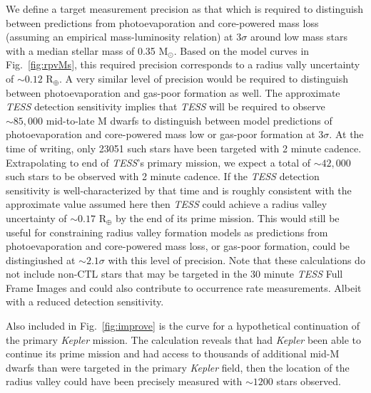 \documentclass[twocolumn]{emulateapj}
\newcommand{\kepler}[1]{\emph{Kepler}#1}
\newcommand{\tess}[1]{\emph{TESS}#1}
\begin{document}
We define a target measurement precision as that which is required to distinguish between predictions from photoevaporation
and core-powered mass loss (assuming an empirical mass-luminosity relation) at $3\sigma$ around low mass stars with a median
stellar mass of 0.35 M$_{\odot}$. Based on the model curves in Fig.~\ref{fig:rpvMs},
this required precision corresponds to a radius vally uncertainty of $\sim 0.12$ R$_{\oplus}$. A very similar level
of precision would be required to distinguish between photoevaporation and gas-poor formation as well.
The approximate \tess{} detection sensitivity implies that \tess{} will be required to observe $\sim 85,000$ mid-to-late M dwarfs
to distinguish between model predictions of photoevaporation and core-powered mass low or gas-poor formation at $3\sigma$.
At the time of writing, only 23051 such stars have been targeted with 2 minute cadence. Extrapolating to end of \tess{'s}
primary mission, we expect a total of $\sim 42,000$ such stars to be observed with 2 minute cadence. If the \tess{} detection
sensitivity is well-characterized by that time and is roughly consistent with the approximate value assumed here then \tess{}
could achieve a radius valley uncertainty of $\sim 0.17$ R$_{\oplus}$ by the end of its prime mission.
This would still be useful for constraining radius valley formation models as predictions from photoevaporation and
core-powered mass loss, or gas-poor formation, could be distingiushed at $\sim 2.1\sigma$ with this level of precision.
Note that these calculations do not include non-CTL stars that may be targeted in the 30 minute \tess{} Full Frame Images
and could also contribute to occurrence rate measurements. Albeit with a reduced detection sensitivity.

Also included in Fig.~\ref{fig:improve} is the curve for a hypothetical continuation of the primary \kepler{} mission.
The calculation reveals that had \kepler{} been able to continue its prime mission and had
access to thousands of additional mid-M dwarfs than were targeted in the primary \kepler{} field, then the location
of the radius valley could have been precisely measured with $\sim 1200$ stars observed.
\end{document}
